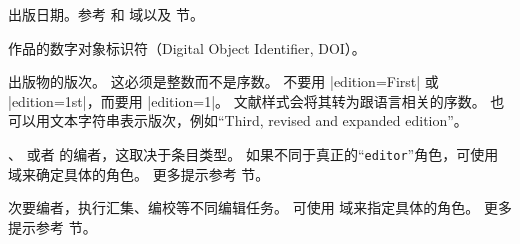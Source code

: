\begin{fieldlist}

出版日期。参考  和  域以及  节。




作品的数字对象标识符（Digital Object Identifier,  DOI）。




出版物的版次。
这必须是整数而不是序数。
不要用 |edition={First}| 或 |edition={1st}|，而要用 |edition={1}|。
文献样式会将其转为跟语言相关的序数。
也可以用文本字符串表示版次，例如“Third, revised and expanded edition”。




、 或者  的编者，这取决于条目类型。
如果不同于真正的“\texttt{editor}”角色，可使用  域来确定具体的角色。
更多提示参考  节。




次要编者，执行汇集、编校等不同编辑任务。
可使用  域来指定具体的角色。
更多提示参考  节。



\end{fieldlist}
